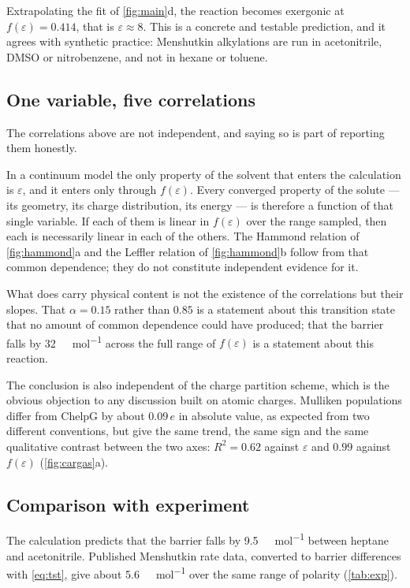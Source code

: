 \documentclass[10pt,a4paper]{article}
\begin{document}
Extrapolating the fit of \cref{fig:main}d, the reaction becomes exergonic at
$f(\varepsilon) = 0.414$, that is $\varepsilon \approx 8$. This is a concrete and
testable prediction, and it agrees with synthetic practice: Menshutkin alkylations
are run in acetonitrile, DMSO or nitrobenzene, and not in hexane or toluene.

\subsection{One variable, five correlations}

The correlations above are not independent, and saying so is part of reporting them
honestly.

In a continuum model the only property of the solvent that enters the calculation is
$\varepsilon$, and it enters only through $f(\varepsilon)$. Every converged property
of the solute --- its geometry, its charge distribution, its energy --- is therefore a
function of that single variable. If each of them is linear in $f(\varepsilon)$ over
the range sampled, then each is necessarily linear in each of the others. The
Hammond relation of \cref{fig:hammond}a and the Leffler relation of
\cref{fig:hammond}b follow from that common dependence; they do not constitute
independent evidence for it.

What does carry physical content is not the existence of the correlations but their
slopes. That $\alpha = 0.15$ rather than $0.85$ is a statement about this transition
state that no amount of common dependence could have produced; that the barrier
falls by \SI{32}{\kilo\calorie\per\mole} across the full range of
$f(\varepsilon)$ is a statement about this reaction.

The conclusion is also independent of the charge partition scheme, which is the
obvious objection to any discussion built on atomic charges. Mulliken populations
differ from ChelpG by about $0.09\,e$ in absolute value, as expected from two
different conventions, but give the same trend, the same sign and the same
qualitative contrast between the two axes: $R^{2} = 0.62$ against $\varepsilon$ and
$0.99$ against $f(\varepsilon)$ (\cref{fig:cargas}a).

\subsection{Comparison with experiment}
\label{sec:exp}

The calculation predicts that the barrier falls by
\SI{9.5}{\kilo\calorie\per\mole} between heptane and acetonitrile. Published
Menshutkin rate data, converted to barrier differences with \cref{eq:tst}, give
about \SI{5.6}{\kilo\calorie\per\mole} over the same range of polarity
(\cref{tab:exp}).
\end{document}
